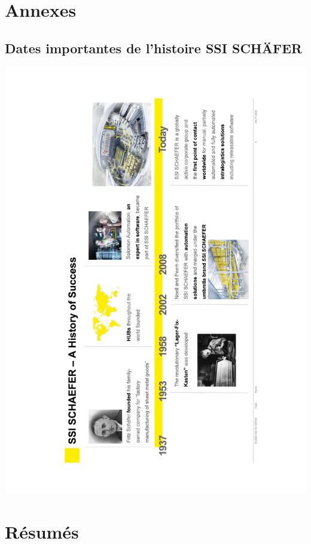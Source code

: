 \documentclass[a4paper, 12pt, french]{article}
\begin{document}
	\section*{Annexes}
		\renewcommand{\thesubsection}{\Alph{subsection}}

		\subsection{Dates importantes de l'histoire SSI SCHÄFER}\label{appendix:history}
			\includegraphics[width=0.8\linewidth]{../images/history.pdf}	

		\newpage

	\section*{Résumés}
		
\end{document}
